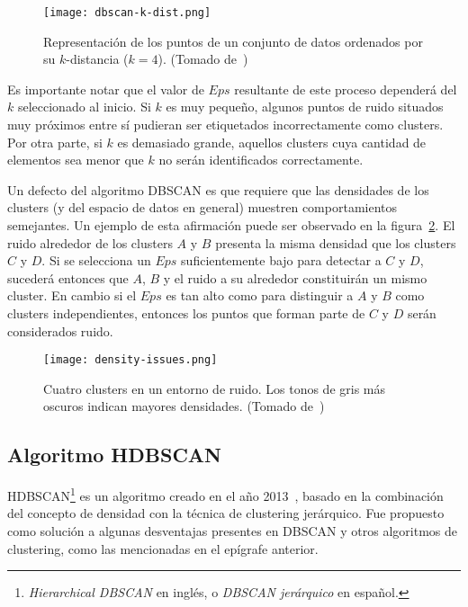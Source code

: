 \begin{figure}[!h]
    \centering
    \texttt{[image: dbscan-k-dist.png]}
    \caption{Representación de los puntos de un conjunto de datos ordenados por su $k$-distancia ($k=4$). (Tomado de~\cite{Tan05})}
    \label{img:dbscan-k-dist}
\end{figure}

Es importante notar que el valor de $Eps$ resultante de este proceso dependerá del $k$ seleccionado al inicio.
Si $k$ es muy pequeño, algunos puntos de ruido situados muy próximos entre sí pudieran ser etiquetados incorrectamente como clusters.
Por otra parte, si $k$ es demasiado grande, aquellos clusters cuya cantidad de elementos sea menor que $k$ no serán identificados correctamente.

Un defecto del algoritmo DBSCAN es que requiere que las densidades de los clusters (y del espacio de datos en general) muestren comportamientos semejantes.
Un ejemplo de esta afirmación puede ser observado en la figura~\ref{img:density-issues}.
El ruido alrededor de los clusters $A$ y $B$ presenta la misma densidad que los clusters $C$ y $D$.
Si se selecciona un $Eps$ suficientemente bajo para detectar a $C$ y $D$, sucederá entonces que $A$, $B$ y el ruido a su alrededor constituirán un mismo cluster.
En cambio si el $Eps$ es tan alto como para distinguir a $A$ y $B$ como clusters independientes, entonces los puntos que forman parte de $C$ y $D$ serán considerados ruido.

\begin{figure}[!h]
    \centering
    \texttt{[image: density-issues.png]}
    \caption{Cuatro clusters en un entorno de ruido.
    Los tonos de gris más oscuros indican mayores densidades. (Tomado de~\cite{Tan05})}
    \label{img:density-issues}
\end{figure}

\subsection{Algoritmo HDBSCAN}\label{subsec:HDBSCAN}

HDBSCAN\footnote{\textit{Hierarchical DBSCAN} en inglés, o \textit{DBSCAN jerárquico} en español.} es un algoritmo creado en el año 2013~\cite{Campello13}, basado en la combinación del concepto de densidad con la técnica de clustering jerárquico.
Fue propuesto como solución a algunas desventajas presentes en DBSCAN y otros algoritmos de clustering, como las mencionadas en el epígrafe anterior.

